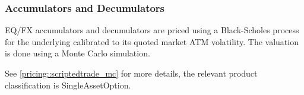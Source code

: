 \subsubsection{Accumulators and Decumulators}
\label{pricing::accumulator}

EQ/FX accumulators and decumulators are priced using a Black-Scholes process for the
underlying calibrated to its quoted market ATM volatility. The valuation is done using a Monte Carlo simulation.

See \ref{pricing::scriptedtrade_mc} for more details, the relevant product classification is SingleAssetOption.
